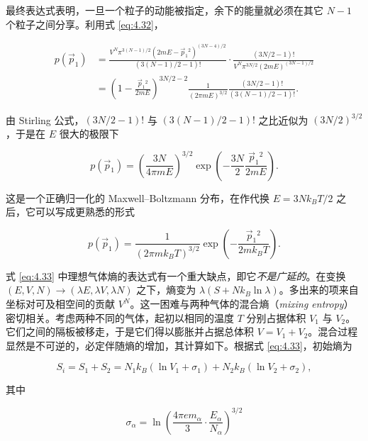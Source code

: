 最终表达式表明，一旦一个粒子的动能被指定，余下的能量就必须在其它 $N-1$ 个粒子之间分享。利用式 \eqref{eq:4.32}，

\begin{equation}\label{eq:4.37}
  \begin{aligned}
    p(\vec p_1)&=\frac{V^N\pi^{3(N-1)/2}(2mE-\vec p_1{}^2)^{(3N-4)/2}}{(3(N-1)/2-1)!}\cdot\frac{(3N/2-1)!}{V^N\pi^{3N/2}(2mE)^{(3N-1)/2}}\\
    &=\left(1-\frac{\vec p_1{}^2}{2mE}\right)^{3N/2-2}\frac{1}{(2\pi mE)^{3/2}}\frac{(3N/2-1)!}{(3(N-1)/2-1)!}.
  \end{aligned}
\end{equation}

由 Stirling 公式，$(3N/2-1)!$ 与 $(3(N-1)/2-1)!$ 之比近似为 $(3N/2)^{3/2}$，于是在 $E$ 很大的极限下

\begin{equation}\label{eq:4.38}
  p(\vec p_1)=\left(\frac{3N}{4\pi mE}\right)^{3/2}\exp\left(-\frac{3N}{2}\frac{\vec p_1{}^2}{2mE}\right).
\end{equation}

这是一个正确归一化的 Maxwell--Boltzmann 分布，在作代换 $E=3Nk_BT/2$ 之后，它可以写成更熟悉的形式

\begin{equation}\label{eq:4.39}
  p(\vec p_1)=\frac{1}{(2\pi mk_BT)^{3/2}}\exp\left(-\frac{\vec p_1{}^2}{2mk_BT}\right).
\end{equation}


式 \eqref{eq:4.33} 中理想气体熵的表达式有一个重大缺点，即它\emph{不是广延的}。在变换 $(E,V,N)\to(\lambda E,\lambda V,\lambda N)$ 之下，熵变为 $\lambda(S+Nk_B\ln\lambda)$。多出来的项来自坐标对可及相空间的贡献 $V^N$。这一困难与两种气体的混合熵（\textit{mixing entropy}）密切相关。考虑两种不同的气体，起初以相同的温度 $T$ 分别占据体积 $V_1$ 与 $V_2$。它们之间的隔板被移走，于是它们得以膨胀并占据总体积 $V=V_1+V_2$。混合过程显然是不可逆的，必定伴随熵的增加，其计算如下。根据式 \eqref{eq:4.33}，初始熵为

\begin{equation}\label{eq:4.40}
  S_i=S_1+S_2=N_1k_B(\ln V_1+\sigma_1)+N_2k_B(\ln V_2+\sigma_2),
\end{equation}

其中

\begin{equation}\label{eq:4.41}
  \sigma_\alpha=\ln\left(\frac{4\pi em_\alpha}{3}\cdot\frac{E_\alpha}{N_\alpha}\right)^{3/2}
\end{equation}


